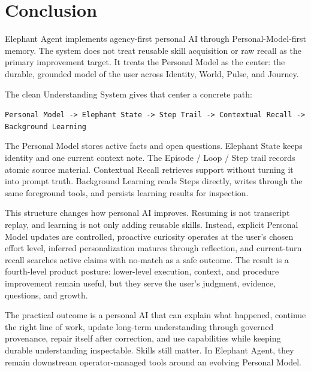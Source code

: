 \section{Conclusion}
\label{sec:conclusion}

Elephant Agent implements agency-first personal AI through Personal-Model-first
memory. The system does not treat reusable skill acquisition or raw recall as
the primary improvement target. It treats the Personal Model as the center: the
durable, grounded model of the user across Identity, World, Pulse, and Journey.

The clean Understanding System gives that center a concrete path:

\begin{center}
\texttt{Personal Model -> Elephant State -> Step Trail -> Contextual Recall -> Background Learning}
\end{center}

The Personal Model stores active facts and open questions. Elephant State keeps
identity and one current context note. The Episode / Loop / Step trail records
atomic source material. Contextual Recall retrieves support without turning it
into prompt truth. Background Learning reads Steps directly, writes through the
same foreground tools, and persists learning results for inspection.

This structure changes how personal AI improves. Resuming is not transcript
replay, and learning is not only adding reusable skills. Instead, explicit
Personal Model updates are controlled, proactive curiosity operates at the
user's chosen effort level, inferred personalization matures through reflection,
and current-turn recall searches active claims with no-match as a safe outcome.
The result is a fourth-level product posture: lower-level execution, context,
and procedure improvement remain useful, but they serve the user's judgment,
evidence, questions, and growth.

The practical outcome is a personal AI that can explain what happened, continue
the right line of work, update long-term understanding through governed
provenance, repair itself after correction, and use capabilities while keeping
durable understanding inspectable. Skills still matter. In Elephant Agent, they remain
downstream operator-managed tools around an evolving Personal Model.
